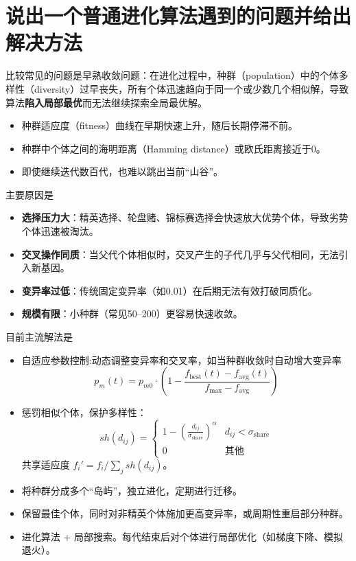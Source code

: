 \documentclass[12pt,a4paper,UTF8]{ctexart}
\begin{document}
\section{说出一个普通进化算法遇到的问题并给出解决方法}

比较常见的问题是早熟收敛问题：在进化过程中，种群（population）中的个体多样性（diversity）过早丧失，所有个体迅速趋向于同一个或少数几个相似解，导致算法\textbf{陷入局部最优}而无法继续探索全局最优解。
\begin{itemize}
    \item 种群适应度（fitness）曲线在早期快速上升，随后长期停滞不前。
    \item 种群中个体之间的海明距离（Hamming distance）或欧氏距离接近于0。
    \item 即使继续迭代数百代，也难以跳出当前“山谷”。
\end{itemize}
主要原因是
\begin{itemize}
    \item \textbf{选择压力大}：精英选择、轮盘赌、锦标赛选择会快速放大优势个体，导致劣势个体迅速被淘汰。
    \item \textbf{交叉操作同质}：当父代个体相似时，交叉产生的子代几乎与父代相同，无法引入新基因。
    \item \textbf{变异率过低}：传统固定变异率（如0.01）在后期无法有效打破同质化。
    \item \textbf{规模有限}：小种群（常见50--200）更容易快速收敛。
\end{itemize}
目前主流解法是
\begin{itemize}
\item 自适应参数控制:动态调整变异率和交叉率，如当种群收敛时自动增大变异率
\[
p_m(t) = p_{m0} \cdot \left(1 - \frac{f_{\text{best}}(t) - f_{\text{avg}}(t)}{f_{\text{max}} - f_{\text{avg}}}\right)
\]
\item 惩罚相似个体，保护多样性：
\[
sh(d_{ij}) = 
\begin{cases}
1 - \left( \frac{d_{ij}}{\sigma_{\text{share}}} \right)^\alpha & d_{ij} < \sigma_{\text{share}} \\
0 & \text{其他}
\end{cases}
\]
共享适应度 \( f_i' = f_i / \sum_j sh(d_{ij}) \)。
\item 将种群分成多个“岛屿”，独立进化，定期进行迁移。
\item 保留最佳个体，同时对非精英个体施加更高变异率，或周期性重启部分种群。
\item 进化算法 + 局部搜索。每代结束后对个体进行局部优化（如梯度下降、模拟退火）。
\end{itemize}
\end{document}
